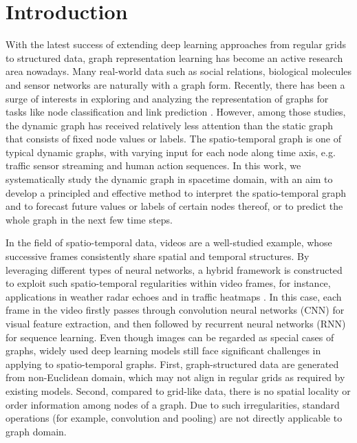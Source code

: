 \documentclass[sigconf,screen]{acmart}
\begin{document}



\maketitle

\section{Introduction}
With the latest success of extending deep learning approaches from regular grids to structured data, graph representation learning has become an active research area nowadays. Many real-world data such as social relations, biological molecules and sensor networks are naturally with a graph form. Recently, there has been a surge of interests in exploring and analyzing the representation of graphs for tasks like node classification and link prediction \cite{kipf2016semi,hamilton2017inductive,gao2018large}. However, among those studies, the dynamic graph has received relatively less attention than the static graph that consists of fixed node values or labels. The spatio-temporal graph is one of typical dynamic graphs, with varying input for each node along time axis, e.g. traffic sensor streaming and human action sequences. In this work, we systematically study the dynamic graph in spacetime domain, with an aim to develop a principled and effective method to interpret the spatio-temporal graph and to forecast future values or labels of certain nodes thereof, or to predict the whole graph in the next few time steps.

In the field of spatio-temporal data, videos are a well-studied example, whose successive frames consistently share spatial and temporal structures. By leveraging different types of neural networks, a hybrid framework is constructed to exploit such spatio-temporal regularities within video frames, for instance, applications in weather radar echoes \cite{xingjian2015convolutional} and in traffic heatmaps \cite{zhang2018predicting}. In this case, each frame in the video firstly passes through convolution neural networks (CNN) for visual feature extraction, and then followed by recurrent neural networks (RNN) for sequence learning. Even though images can be regarded as special cases of graphs, widely used deep learning models still face significant challenges in applying to spatio-temporal graphs. First, graph-structured data are generated from non-Euclidean domain, which may not align in regular grids as required by existing models. Second, compared to grid-like data, there is no spatial locality or order information among nodes of a graph. Due to such irregularities, standard operations (for example, convolution and pooling) are not directly applicable to graph domain.
\end{document}
